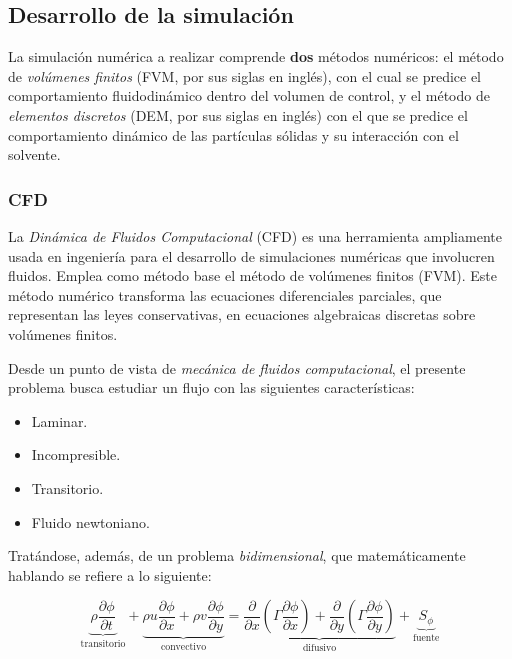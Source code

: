 \newpage

\subsection{Desarrollo de la simulaci\'on}

\noindent
\justify

La simulaci\'on num\'erica a realizar comprende \textbf{dos} m\'etodos num\'ericos: el m\'etodo de \textit{vol\'umenes finitos} (FVM, por sus siglas en ingl\'es), con el cual se predice el comportamiento fluidodin\'amico dentro del volumen de control, y el m\'etodo de \textit{elementos discretos} (DEM, por sus siglas en ingl\'es) con el que se predice el comportamiento din\'amico de las part\'iculas s\'olidas y su interacci\'on con el solvente.

\subsubsection{CFD} \label{CFD:problema}

\noindent
\justify

La \textit{Din\'amica de Fluidos Computacional} (CFD) es una herramienta ampliamente usada en ingenier\'ia para el desarrollo de simulaciones num\'ericas que involucren fluidos. Emplea como m\'etodo base el m\'etodo de vol\'umenes finitos (FVM). Este m\'etodo num\'erico transforma las ecuaciones diferenciales parciales, que representan las leyes conservativas, en ecuaciones algebraicas discretas sobre vol\'umenes finitos.

\noindent
\justify

Desde un punto de vista de \textit{mec\'anica de fluidos computacional}, el presente problema busca estudiar un flujo con las siguientes caracter\'isticas:

\begin{itemize}
	\item Laminar.
	\item Incompresible.
	\item Transitorio.
	\item Fluido newtoniano.
\end{itemize}

\noindent
\justify

Trat\'andose, adem\'as, de un problema \textit{bidimensional}, que matem\'aticamente hablando se refiere a lo siguiente:

\begin{equation}
    \underbrace{\rho \frac{\partial \phi}{\partial t}}_{\text{transitorio}} + \underbrace{\rho u \frac{\partial \phi}{\partial x} + \rho v \frac{\partial \phi}{\partial y}}_{\text{convectivo}} = \underbrace{ \frac{\partial}{\partial x} \left( \Gamma \frac{\partial \phi}{\partial x} \right) + \frac{\partial}{\partial y} \left( \Gamma \frac{\partial \phi}{\partial y} \right)}_{\text{difusivo}} + \underbrace{S_{\phi}}_{\text{fuente}}
    \tag{9}
    \label{2D}
\end{equation}

